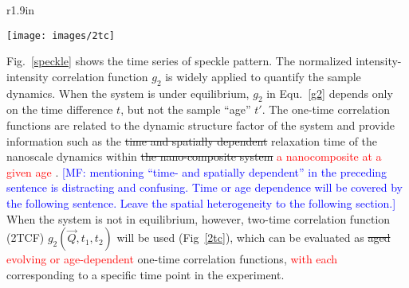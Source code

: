 
\begin{wrapfigure}[13]{r}{1.9in}
  \vspace{-30pt}
  \begin{center}
\texttt{[image: images/2tc]}
  \end{center}
  \vspace{-20pt}
  \caption{\footnotesize 2-time Correlation Function in out-of-equilibrium system}
\label{2tc}
  \vspace{-20pt}
\end{wrapfigure}

Fig.~\ref{speckle} shows the time series of speckle pattern. The normalized intensity-intensity  correlation function $g_2$ is widely applied to quantify the sample dynamics.  When the system is under equilibrium, $g_2$ in Equ.~\ref{g2} depends only on the time difference $t$, but not the sample “age” $t'$. The one-time correlation functions are related to the dynamic structure factor of the system and provide information such as the \sout{time and spatially dependent} relaxation time of the nanoscale dynamics within \sout{ the nano-composite system} 
\textcolor{red}{a nanocomposite at a given age}
.  
\textcolor{blue}{[MF: mentioning ``time- and spatially dependent'' in the preceding sentence is distracting and confusing. Time or age dependence will be covered by the following sentence. Leave the spatial heterogeneity to the following section.]}
When the system is not in equilibrium, however, two-time correlation function (2TCF) $g_2(\vec{Q},t_1, t_2)$ will be used (Fig~\ref{2tc}), which can be evaluated as \sout{aged}
\textcolor{red}{evolving or age-dependent} one-time correlation functions, 
\textcolor{red}{with each} corresponding to a specific time point in the experiment.





